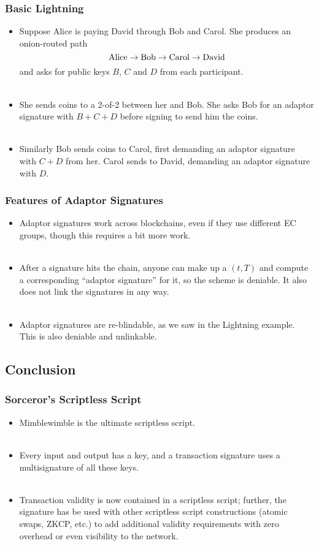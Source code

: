 \documentclass{beamer}
\begin{document}
\frame
{
  \frametitle{Basic Lightning}

  \begin{itemize}
  \item Suppose Alice is paying David through Bob and Carol. She produces an onion-routed
        path
        \[ \textnormal{Alice} \to \textnormal{Bob} \to \textnormal{Carol} \to \textnormal{David} \]
        and asks for public keys $B$, $C$ and $D$ from each participant.\\~\\
  \item She sends coins to a 2-of-2 between her and Bob. She asks Bob for an adaptor signature
        with $B + C + D$ before signing to send him the coins.\\~\\
  \item Similarly Bob sends coins to Carol, first demanding an adaptor signature with $C + D$
        from her. Carol sends to David, demanding an adaptor signature with $D$.
  \end{itemize}
}

\frame
{
  \frametitle{Features of Adaptor Signatures}
  \begin{itemize}
  \item Adaptor signatures work across blockchains, even if they use different EC groups,
        though this requires a bit more work.\\~\\
  \item After a signature hits the chain, anyone can make up a $(t, T)$ and
        compute a corresponding ``adaptor signature'' for it, so the scheme is deniable.
        It also does not link the signatures in any way.\\~\\
  \item Adaptor signatures are re-blindable, as we saw in the Lightning example. This
        is also deniable and unlinkable.
  \end{itemize}
}

\subsection{Conclusion}
\frame
{ 
  \frametitle{Sorceror's Scriptless Script}

  \begin{itemize}
  \item Mimblewimble is the ultimate scriptless script.\\~\\
  \item Every input and output has a key, and a transaction signature uses a multisignature
        of all these keys.\\~\\
  \item Transaction validity is now contained in a scriptless script; further,
        the signature has be used with other scriptless script constructions
        (atomic swaps, ZKCP, etc.) to add additional validity requirements with
        zero overhead or even visibility to the network.
  \end{itemize}
}
\end{document}

